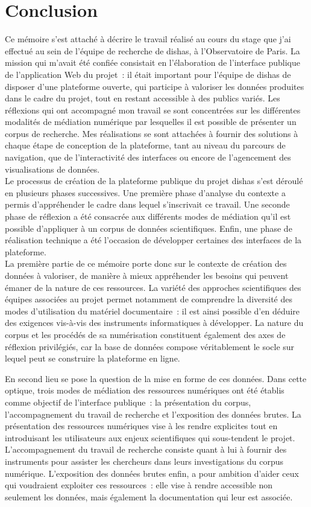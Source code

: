 \documentclass[a4paper,12pt,twoside]{book}
\newcommand{\clearemptydoublepage}{\newpage{\pagestyle{empty}\cleardoublepage}}
\newcommand\mychapter[1]{%
  \chapter*{#1}%
  \markright{\MakeUppercase{#1}}%
}
\newcommand{\bdd}{base de données\xspace}
\newcommand{\dishas}{\gls{dishas}\xspace}
\begin{document}
\clearemptydoublepage

\mychapter{Conclusion}
Ce mémoire s'est attaché à décrire le travail réalisé au cours du stage que j'ai effectué au sein de l'équipe de recherche de \dishas, à l'Observatoire de Paris. La mission qui m'avait été confiée consistait en l'élaboration de l'interface publique de l'application Web du projet~: il était important pour l'équipe de \dishas de disposer d'une plateforme ouverte, qui participe à valoriser les données produites dans le cadre du projet, tout en restant accessible à des publics variés. Les réflexions qui ont accompagné mon travail se sont concentrées sur les différentes modalités de médiation numérique par lesquelles il est possible de présenter un corpus de recherche. Mes réalisations se sont attachées à fournir des solutions à chaque étape de conception de la plateforme, tant au niveau du parcours de navigation, que de l'interactivité des interfaces ou encore de l'agencement des visualisations de données.\\

Le processus de création de la plateforme publique du projet \dishas s'est déroulé en plusieurs phases successives. Une première phase d'analyse du contexte a permis d'appréhender le cadre dans lequel s'inscrivait ce travail. Une seconde phase de réflexion a été consacrée aux différents modes de médiation qu'il est possible d'appliquer à un corpus de données scientifiques. Enfin, une phase de réalisation technique a été l'occasion de développer certaines des interfaces de la plateforme.\\

La première partie de ce mémoire porte donc sur le contexte de création des données à valoriser, de manière à mieux appréhender les besoins qui peuvent émaner de la nature de ces ressources. La variété des approches scientifiques des équipes associées au projet permet notamment de comprendre la diversité des modes d'utilisation du matériel documentaire~: il est ainsi possible d'en déduire des exigences vis-à-vis des instruments informatiques à développer. La nature du corpus et les procédés de sa numérisation constituent également des axes de réflexion privilégiés, car la \bdd compose véritablement le socle sur lequel peut se construire la plateforme en ligne.

En second lieu se pose la question de la mise en forme de ces données. Dans cette optique, trois modes de médiation des ressources numériques ont été établis comme objectif de l'interface publique~: la présentation du corpus, l'accompagnement du travail de recherche et l'exposition des données brutes. La présentation des ressources numériques vise à les rendre explicites tout en introduisant les utilisateurs aux enjeux scientifiques qui sous-tendent le projet. L'accompagnement du travail de recherche consiste quant à lui à fournir des instruments pour assister les chercheurs dans leurs investigations du corpus numérique. L'exposition des données brutes enfin, a pour ambition d'aider ceux qui voudraient exploiter ces ressources~: elle vise à rendre accessible non seulement les données, mais également la documentation qui leur est associée.
\end{document}
